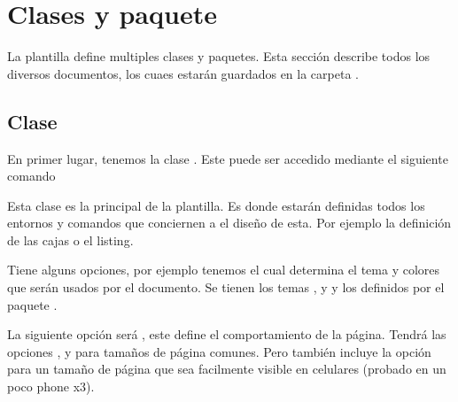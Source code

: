 \documentclass[theme=mocha, pagecolor, pagesize=a5paper, stretchmode=true]{qx-files/qx-notes}
\title{\texpkgname{qx-files}}
\author{Qx}
\date{\today}
\begin{document}
  \maketitle




  \begin{abstract}
    El objetivo de esta plantilla es definir una serie de macros y herramientas con el objetivo de la creación de notas matemáticas o de programación de manera simple.

    Incluye varias opciones para la customización de la apariencia.También, estará modularizado, por lo que si solo se requiere una porción de los comandos, basta con cargar el paquete que lo contenga únicamente.
  \end{abstract}



  \section{Clases y paquete}

  La plantilla define multiples clases y paquetes. Esta sección describe todos los diversos documentos, los cuaes estarán guardados en la carpeta .



  \subsection{Clase }

  En primer lugar, tenemos la clase . Este puede ser accedido mediante el siguiente comando

  Esta clase es la principal de la plantilla. Es donde estarán definidas todos los entornos y comandos que conciernen a el diseño de esta. Por ejemplo la definición de las cajas o el listing.

  Tiene alguns opciones, por ejemplo tenemos  el cual determina el tema y colores que serán usados por el documento. Se tienen los temas ,  y  y los definidos por el paquete .

  La siguiente opción será , este define el comportamiento de la página. Tendrá las opciones ,  y  para tamaños de página comunes. Pero también incluye la opción  para un tamaño de página que sea facilmente visible en celulares (probado en un poco phone x3).
\end{document}

